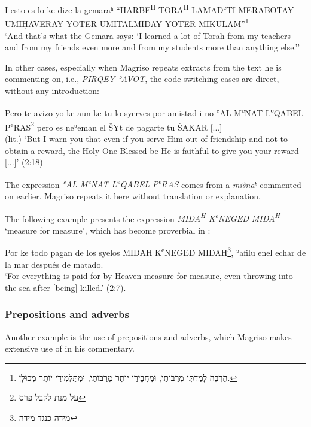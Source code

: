 \documentclass[output=paper,colorlinks,citecolor=brown,babel,arabicfont]{langscibook}
\begin{document}
\ea\label{ch3.7.ex.n11}
I esto es lo ke dize la gemaraʰ ``HARBE\textsuperscript{H} TORA\textsuperscript{H} LAMAD\textsuperscript{e}TI MERABOTAY UMIḤAVERAY YOTER UMITALMIDAY YOTER MIKULAM''\footnote{\texthebrew{הַרְבֵּה לָמַדְתִּי מֵרַבּוֹתַי, וּמֵחֲבֵירַי יוֹתֵר מֵרַבּוֹתַי, וּמִתַּלְמִידַי יוֹתֵר מִכּוּלָּן.}} \\
`And that's what the Gemara says: `I learned a lot of Torah from my teachers and from my friends even more and from my students more than anything else.'' 
\z

In other cases, especially when Magriso repeats extracts from the text he is commenting on, i.e., \textit{PIRQEY ʾAVOT}, the code-switching cases are direct, without any introduction: 

\ea\label{ch3.7.ex.n12}
Pero te avizo yo ke aun ke tu lo syerves por amistad i no ʿAL M\textsuperscript{e}NAT L\textsuperscript{e}QABEL P\textsuperscript{e}RAS\footnote{\texthebrew{על מנת לקבל פרס}} pero es neʾeman el ŠYt de pagarte tu ŚAKAR {[...]} \\
(lit.) `But I warn you that even if you serve Him out of friendship and not to obtain a reward, the Holy One Blessed be He is faithful to give you your reward {[...]}' (2:18)
\z

The expression \textit{ʿAL M\textsuperscript{e}NAT L\textsuperscript{e}QABEL P\textsuperscript{e}RAS} comes from a \textit{mišnaʰ} commented on earlier. Magriso repeats it here without translation or explanation. 


The following example presents the expression \textit{MIDA\textsuperscript{H} K\textsuperscript{e}NEGED MIDA\textsuperscript{H}} `measure for measure', which has become proverbial in :


\ea\label{ch3.7.ex.n13}
Por ke todo pagan de los syelos MIDAH K\textsuperscript{e}NEGED MIDAH\footnote{\texthebrew{מידה כנגד מידה}}, ʾafilu enel echar de la mar después de matado. \\
`For everything is paid for by Heaven measure for measure, even throwing into the sea after [being] killed.' (2:7).
\z

\subsubsection{Prepositions and adverbs}\label{ch3.7.ss.3.2.3}

Another example is the use of  prepositions and adverbs, which Magriso makes extensive use of in his commentary. 
\end{document}
